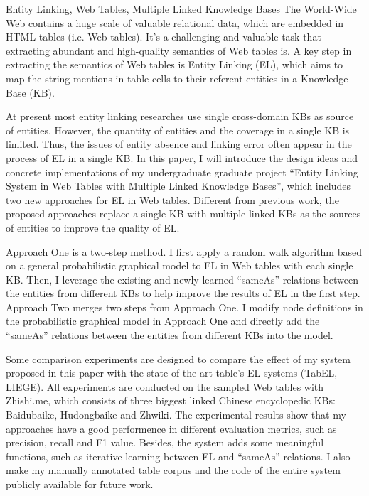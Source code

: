 \documentclass[bachelor]{seuthesis} %
\begin{document}
\begin{englishabstract}{Entity Linking, Web Tables, Multiple Linked Knowledge Bases}
The World-Wide Web contains a huge scale of valuable relational data, which are embedded in HTML tables (i.e. Web tables).
It's a challenging and valuable task that extracting abundant and high-quality semantics of Web tables is.
A key step in extracting the semantics of Web tables is Entity Linking (EL), which aims to map the string mentions in table cells to their referent entities in a Knowledge Base (KB).\par

At present most entity linking researches use single cross-domain KBs as source of entities.
However, the quantity of entities and the coverage in a single KB is limited.
Thus, the issues of entity absence and linking error often appear in the process of EL in a single KB.
In this paper, I will introduce the design ideas and concrete implementations of my undergraduate graduate project ``Entity Linking System in Web Tables with Multiple Linked Knowledge Bases'', which includes two new approaches for EL in Web tables.
Different from previous work, the proposed approaches replace a single KB with multiple linked KBs as the sources of entities to improve the quality of EL.

Approach One is a two-step method.
I first apply a random walk algorithm based on a general probabilistic graphical model to EL in Web tables with each single KB.
Then, I leverage the existing and newly learned ``sameAs'' relations between the entities from different KBs to help improve the results of EL in the first step.
Approach Two merges two steps from Approach One.
I modify node definitions in the probabilistic graphical model in Approach One and directly add the ``sameAs'' relations between the entities from different KBs into the model.\par

Some comparison experiments are designed to compare the effect of my system proposed in this paper with the state-of-the-art table’s EL systems (TabEL, LIEGE).
All experiments are conducted on the sampled Web tables with Zhishi.me, which consists of three biggest linked Chinese encyclopedic KBs: Baidubaike, Hudongbaike and Zhwiki.
The experimental results show that my approaches have a good performence in different evaluation metrics, such as precision, recall and F1 value.
Besides, the system adds some meaningful functions, such as iterative learning between EL and ``sameAs'' relations.
I also make my manually annotated table corpus and the code of the entire system publicly available for future work.
\end{englishabstract}
\end{document}

